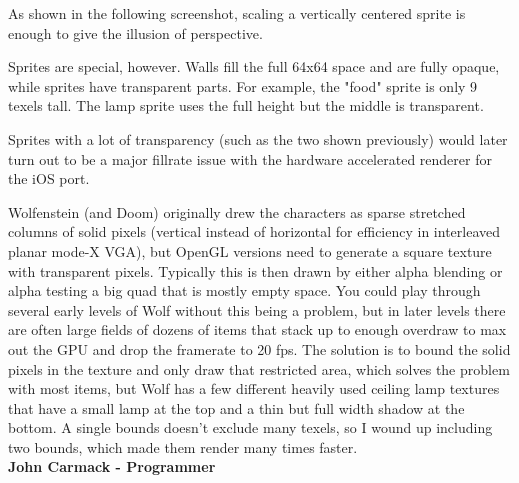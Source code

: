 \par



 As shown in the following screenshot, scaling a vertically centered sprite is enough to give the illusion of perspective.\\
\par
\begin{figure}[H]
 \centering
\end{figure}

Sprites are special, however. Walls fill the full 64x64 space and are fully opaque, while sprites have transparent parts. For example, the "food" sprite is only 9 texels tall. The lamp sprite uses the full height but the middle is transparent.\\


  \begin{minipage}{.5\textwidth} 
   \end{minipage}
  \begin{minipage}{.5\textwidth} 
   \end{minipage}

\par

 Sprites with a lot of transparency (such as the two shown previously) would later turn out to be a major fillrate issue with the hardware accelerated renderer for the iOS port.\\
\par
\begin{fancyquotes}
Wolfenstein (and Doom) originally drew the characters as sparse stretched columns of solid pixels (vertical instead of horizontal for efficiency in interleaved planar mode-X VGA), but OpenGL versions need to generate a square texture with transparent pixels.  Typically this is then drawn by either alpha blending or alpha testing a big quad that is mostly empty space.  You could play through several early levels of Wolf without this being a problem, but in later levels there are often large fields of dozens of items that stack up to enough overdraw to max out the GPU and drop the framerate to 20 fps.  The solution is to bound the solid pixels in the texture and only draw that restricted area, which solves the problem with most items, but Wolf has a few different heavily used ceiling lamp textures that have a small lamp at the top and a thin but full width shadow at the bottom.  A single bounds doesn't exclude many texels, so I wound up including two bounds, which made them render many times faster. 
\bigskip \\
\textbf{John Carmack - Programmer}
 \end{fancyquotes}

